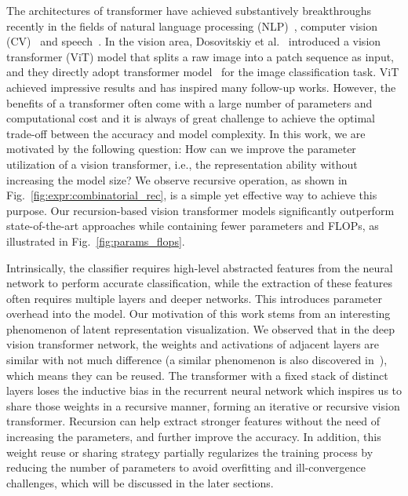 \documentclass[runningheads]{llncs}
\begin{document}
	The architectures of transformer have achieved substantively breakthroughs recently in the fields of natural language processing (NLP)~\cite{vaswani2017attention}, computer vision (CV)~\cite{dosovitskiy2021an} and speech~\cite{8462506,wang2021transformer}. In the vision area, Dosovitskiy et al.~\cite{dosovitskiy2021an} introduced a vision transformer (ViT) model that splits a raw image into a patch sequence as input, and they directly adopt transformer model~\cite{vaswani2017attention} for the image classification task. ViT achieved impressive results and has inspired many follow-up works. However, the benefits of a transformer often come with a large number of parameters and computational cost and it is always of great challenge to achieve the optimal trade-off between the accuracy and model complexity. In this work, we are motivated by the following question: { How can we improve the parameter utilization of a vision transformer, i.e., the representation ability without increasing the model size?} We observe recursive operation, as shown in Fig.~\ref{fig:expr:combinatorial_rec}, is a simple yet effective way to achieve this purpose. Our recursion-based vision transformer models significantly outperform state-of-the-art approaches while containing fewer parameters and FLOPs, as illustrated in Fig.~\ref{fig:params_flops}.
	
	Intrinsically, the classifier requires high-level abstracted features from the neural network to perform accurate classification, while the extraction of these features often requires multiple layers and deeper networks. This introduces parameter overhead into the model. Our motivation of this work stems from an interesting phenomenon of latent representation visualization. We observed that in the deep vision transformer network, the weights and activations of adjacent layers are similar with not much difference (a similar phenomenon is also discovered in~\cite{zhou2021deepvit}), which means they can be reused. The transformer with a fixed stack of distinct layers loses the inductive bias in the recurrent neural network which inspires us to share those weights in a recursive manner, forming an iterative or recursive vision transformer. Recursion can help extract stronger features without the need of increasing the parameters, and further improve the accuracy. In addition, this weight reuse or sharing strategy partially regularizes the training process by reducing the number of parameters to avoid overfitting and ill-convergence challenges, which will be discussed in the later sections.
	
\end{document}
